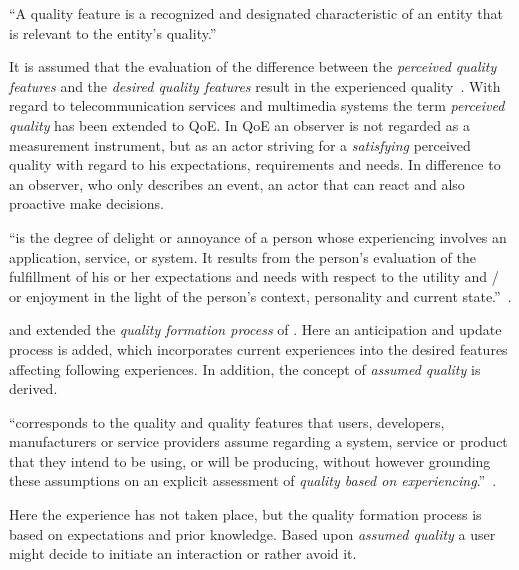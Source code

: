 \begin{definition}
``A quality feature is a recognized and designated characteristic of an entity that is relevant to the entity's quality.''~\citep[][p. 17]{jekosch_voice_2005}
\end{definition}

It is assumed that the evaluation of the difference between the \emph{perceived quality features} and the \emph{desired quality features} result in the experienced quality~\citet[p. 23]{moller_quality_2014}.
With regard to telecommunication services and multimedia systems the term \emph{perceived quality} has been extended to \acf{QoE}.
In \ac{QoE} an observer is not regarded as a measurement instrument, but as an actor striving for a \emph{satisfying} perceived quality with regard to his expectations, requirements and needs.
In difference to an observer, who only describes an event, an actor that can react and also proactive make decisions.

\begin{definition}
``is the degree of delight or annoyance of a person whose experiencing involves an application, service, or system.
It results from the person’s evaluation of the fulfillment of his or her expectations and needs with respect to the utility and / or enjoyment in the light of the person’s context, personality and current state.''~\citep[][p. 19]{raake_quality_2014}.
\end{definition}

\citet{raake_speech_2006} and \citet{raake_quality_2014} extended the \emph{quality formation process} of \citet{jekosch_voice_2005}.
Here an anticipation and update process is added, which incorporates current experiences into the desired features affecting following experiences.
In addition, the concept of \emph{assumed quality} is derived.
\begin{definition}\label{def:assumedquality}
``corresponds to the quality and quality features that users, developers, manufacturers or service providers assume regarding a system, service or product that they intend to be using, or will be producing, without however grounding these assumptions on an explicit assessment of \textit{quality based on experiencing}.''~\citep[][p. 17]{raake_quality_2014}.
\end{definition}
Here the experience has not taken place, but the quality formation process is based on expectations and prior knowledge.
Based upon \emph{assumed quality} a user might decide to initiate an interaction or rather avoid it.

